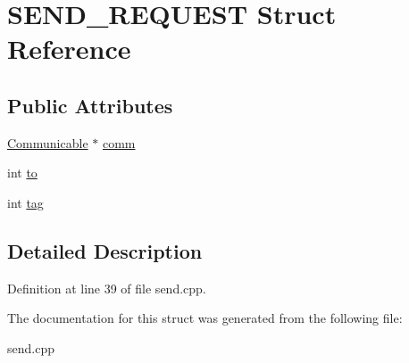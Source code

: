 \hypertarget{structSEND__REQUEST}{
\section{SEND\_\-REQUEST Struct Reference}
\label{structSEND__REQUEST}
}
\subsection*{Public Attributes}
\begin{CompactItemize}
\item 
\hypertarget{structSEND__REQUEST_1ad8f7233fa3ff13262e783a9153920f}{
\hyperlink{classCommunicable}{Communicable} $\ast$ \hyperlink{structSEND__REQUEST_1ad8f7233fa3ff13262e783a9153920f}{comm}}
\label{structSEND__REQUEST_1ad8f7233fa3ff13262e783a9153920f}

\item 
\hypertarget{structSEND__REQUEST_93e2a6a71d2a91aa2b7bdd050ee59b4d}{
int \hyperlink{structSEND__REQUEST_93e2a6a71d2a91aa2b7bdd050ee59b4d}{to}}
\label{structSEND__REQUEST_93e2a6a71d2a91aa2b7bdd050ee59b4d}

\item 
\hypertarget{structSEND__REQUEST_3126b3ef9d6533d3086760e413a7f23f}{
int \hyperlink{structSEND__REQUEST_3126b3ef9d6533d3086760e413a7f23f}{tag}}
\label{structSEND__REQUEST_3126b3ef9d6533d3086760e413a7f23f}

\end{CompactItemize}


\subsection{Detailed Description}




Definition at line 39 of file send.cpp.

The documentation for this struct was generated from the following file:\begin{CompactItemize}
\item 
send.cpp\end{CompactItemize}
